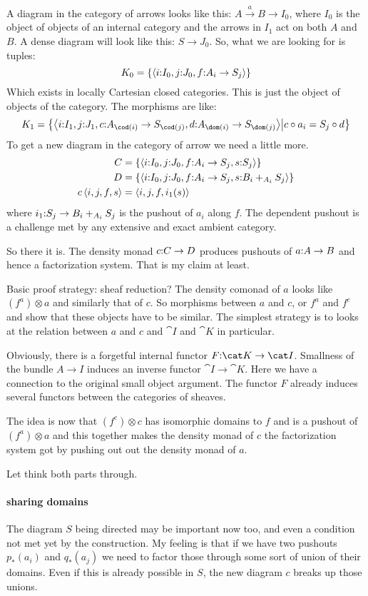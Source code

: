 \documentclass[csh.tex]{subfiles}
\begin{document}
A diagram in the category of arrows looks like this: $ A\stackrel{a}{\to} B\to I_0$, where $I_0$ is the object of objects of an internal category and the arrows in $I_1$ act on both $A$ and $B$. A dense diagram will look like this: $S \to J_0$. So, what we are looking for is tuples:
\[K_0 = \left\{\left\langle i\mathord : I_0,j\mathord : J_0,f\mathord : A_i\to S_j \right\rangle\right\}\]
Which exists in locally Cartesian closed categories. This is just the object of objects of the category. The morphisms are like:
\[K_1 = \set{\tuplet{i\of I_1,j\of J_1,
c\of A_{\cod(i)} \to S_{\cod(j)},
d\of A_{\dom(i)} \to S_{\dom(j)}
}\middle| c \circ a_i = S_j\circ d }\] 
To get a new diagram in the category of arrow we need a little more.
\begin{align*}
C &= \left\{\left\langle i\mathord : I_0,j\mathord : J_0,f\mathord : A_i\to S_j, s\mathord : S_j \right\rangle\right\}\\
D &= \left\{\left\langle i\mathord : I_0,j\mathord : J_0,f\mathord : A_i\to S_j, s\mathord : B_i +_{A_i} S_j \right\rangle\right\}\\
c\left\langle i,j,f,s \right\rangle &= \left\langle i,j,f,i_1(s) \right\rangle
\end{align*}
where $i_1\mathord : S_j\to B_i+_{A_i}S_j$ is the pushout of $a_i$ along $f$.
The dependent pushout is a challenge met by any extensive and exact ambient category.

So there it is. The density monad $c\mathord : C\to D$ produces pushouts of $a\mathord : A\to B$ and hence a factorization system. That is my claim at least.

Basic proof strategy: sheaf reduction? The density comonad of $a$ looks like $(f^a)\otimes a$ and similarly that of $c$. So morphisms between $a$ and $c$, or $f^a$ and $f^c$ and show that these objects have to be similar. The simplest strategy is to looks at the relation between $a$ and $c$ and $\cat I$ and $\cat K$ in particular.

Obviously, there is a forgetful internal functor $F\of \cat K\to \cat I$. Smallness of the bundle $A\to I$ induces an inverse functor $\cat I\to \cat K$. Here we have a connection to the original small object argument. The functor $F$ already induces several functors between the categories of sheaves.

The idea is now that $(f^c)\otimes c$ has isomorphic domains to $f$ and is a pushout of $(f^a)\otimes a$ and this together makes the density monad of $c$ the factorization system got by pushing out out the density monad of $a$.

Let think both parts through. 
\paragraph{sharing domains}
The diagram $S$ being directed may be important now too, and even a condition not met yet by the construction. My feeling is that if we have two pushouts $p_*(a_i)$ and $q_*(a_j)$ we need to factor those through some sort of union of their domains. Even if this is already possible in $S$, the new diagram $c$ breaks up those unions.
\end{document}
